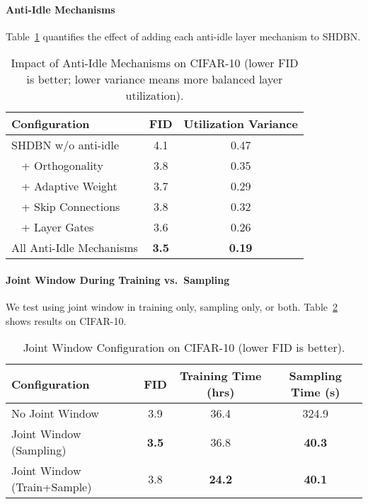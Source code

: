 \documentclass[11pt,letterpaper]{article}
\begin{document}
\paragraph{Anti-Idle Mechanisms}
Table~\ref{tab:antiidle-ablation} quantifies the effect of adding each anti-idle layer mechanism to SHDBN.

\begin{table}[H]
\centering
\caption{Impact of Anti-Idle Mechanisms on CIFAR-10 (lower FID is better; lower variance means more balanced layer utilization).}
\label{tab:antiidle-ablation}
\begin{tabular}{lcc}
\toprule
Configuration & FID & Utilization Variance \\
\midrule
SHDBN w/o anti-idle   & 4.1 & 0.47 \\
$\;\;$ + Orthogonality & 3.8 & 0.35 \\
$\;\;$ + Adaptive Weight & 3.7 & 0.29 \\
$\;\;$ + Skip Connections & 3.8 & 0.32 \\
$\;\;$ + Layer Gates      & 3.6 & 0.26 \\
All Anti-Idle Mechanisms  & \textbf{3.5} & \textbf{0.19} \\
\bottomrule
\end{tabular}
\end{table}

\paragraph{Joint Window During Training vs.\ Sampling}
We test using joint window in training only, sampling only, or both. Table~\ref{tab:jointwindow-ablation} shows results on CIFAR-10.

\begin{table}[H]
\centering
\caption{Joint Window Configuration on CIFAR-10 (lower FID is better).}
\label{tab:jointwindow-ablation}
\begin{tabular}{lccc}
\toprule
Configuration & FID & Training Time (hrs) & Sampling Time (s) \\
\midrule
No Joint Window            & 3.9 & 36.4 & 324.9 \\
Joint Window (Sampling)    & \textbf{3.5} & 36.8 & \textbf{40.3} \\
Joint Window (Train+Sample)& 3.8 & \textbf{24.2} &  \textbf{40.1} \\
\bottomrule
\end{tabular}
\end{table}
\end{document}
